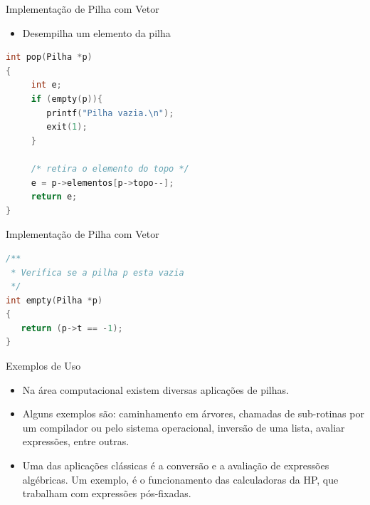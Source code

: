 \begin{frame}[fragile,c]{Implementação de Pilha com Vetor}
\begin{itemize}
	\item Desempilha um elemento da pilha
\end{itemize}
\begin{lstlisting}[language=C]
int pop(Pilha *p)
{
     int e;
     if (empty(p)){
        printf("Pilha vazia.\n");
        exit(1);             
     } 
     
     /* retira o elemento do topo */
     e = p->elementos[p->topo--];
     return e;
}	
\end{lstlisting}  
\end{frame}


\begin{frame}[fragile]{Implementação de Pilha com Vetor}
\begin{lstlisting}[language=C]
/**
 * Verifica se a pilha p esta vazia
 */
int empty(Pilha *p)
{
   return (p->t == -1);
}

\end{lstlisting}
\end{frame}

\begin{frame}{Exemplos de Uso}
\begin{itemize}
	\item Na área computacional existem diversas aplicações de pilhas. 
	\item Alguns exemplos são: caminhamento em árvores, chamadas de sub-rotinas por um compilador ou pelo sistema operacional, inversão de uma lista, avaliar expressões, entre outras.
	\item Uma das aplicações clássicas é a conversão e a avaliação de expressões algébricas. Um exemplo, é o funcionamento das calculadoras da HP, que trabalham com expressões pós-fixadas.
\end{itemize}
\end{frame}

